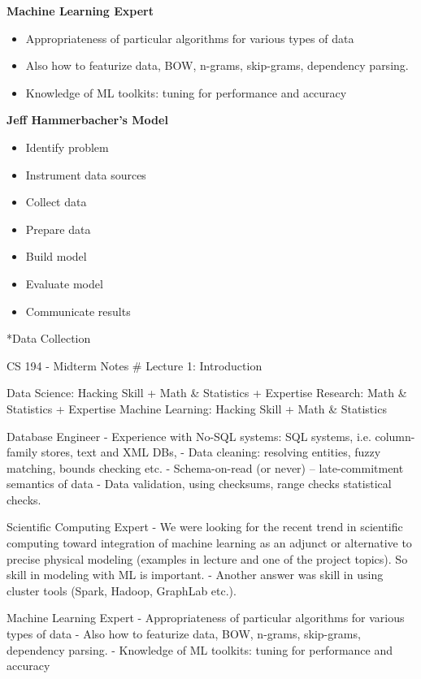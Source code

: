 \documentclass[3pt,landscape]{article}
\makeatletter
\renewcommand{\section}{\@startsection{section}{1}{0mm}{-1ex plus -.5ex minus -.2ex}{0.5ex plus .2ex}{\normalfont\large\bfseries}}
\makeatother
\begin{document}
\begin{multicols}{3}
\textbf{Machine Learning Expert}
\begin{itemize}
\item Appropriateness of particular algorithms for various types of data
\item Also how to featurize data, BOW, n-grams, skip-grams, dependency parsing.
\item Knowledge of ML toolkits: tuning for performance and accuracy 
\end{itemize}


\textbf{Jeff Hammerbacher’s Model}
\begin{itemize}
\item Identify problem
\item Instrument data sources
\item Collect data
\item Prepare data
\item Build model
\item Evaluate model
\item Communicate results
\end{itemize}


\section*{Data Collection}

CS 194 - Midterm Notes
\# Lecture 1: Introduction

Data Science: Hacking Skill + Math \& Statistics + Expertise
Research: Math \& Statistics + Expertise
Machine Learning: Hacking Skill + Math \& Statistics


Database Engineer
- Experience with No-SQL systems: SQL systems, i.e. column-family stores, text and XML DBs,
- Data cleaning: resolving entities, fuzzy matching, bounds checking etc.
- Schema-on-read (or never) – late-commitment semantics of data
- Data validation, using checksums, range checks statistical checks.

Scientific Computing Expert 
- We were looking for the recent trend in scientific computing toward integration of machine learning as an adjunct or alternative to precise physical modeling (examples in lecture and one of the project topics). So skill in modeling with ML is important. 
- Another answer was skill in using cluster tools (Spark, Hadoop, GraphLab etc.). 

Machine Learning Expert
- Appropriateness of particular algorithms for various types of data
- Also how to featurize data, BOW, n-grams, skip-grams, dependency parsing.
- Knowledge of ML toolkits: tuning for performance and accuracy 


\end{multicols}
\end{document}
